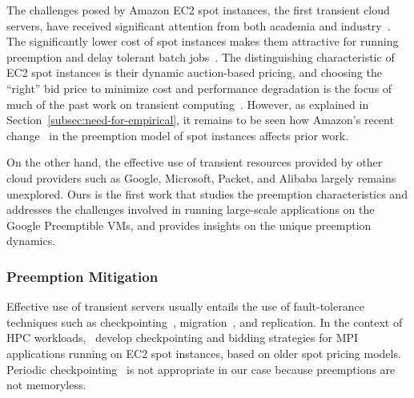 The challenges posed by Amazon EC2 spot instances, the first transient cloud servers, have received significant attention from both academia  and industry~\cite{spotinst}. 
The significantly lower cost of spot instances makes them attractive for running preemption and delay tolerant batch jobs~\cite{spoton, jain14demand, yi2010reducing, conductor, liu-spot, spot-run, dubois2016optispot}.
The distinguishing characteristic of EC2 spot instances is their dynamic auction-based pricing, and choosing the ``right'' bid price to minimize cost and performance degradation is the focus of much of the past work on transient computing~\cite{bidding4,mihailescu2012impact,bidding7,bidding1,bidding8,bidding3,bidding6,bid-cloud,bidding5,wolski_probabilistic_2017, guo_bidding_2015}.
However, as explained in Section~\ref{subsec:need-for-empirical}, it remains to be seen how Amazon's recent change~\cite{bid-change} in the preemption model of spot instances affects prior work. 


On the other hand, the effective use of transient resources provided by other cloud providers such as Google, Microsoft, Packet, and Alibaba largely remains unexplored. 
Ours is the first work that studies the preemption characteristics and addresses the challenges involved in running large-scale applications on the Google Preemptible VMs, and provides insights on the unique preemption dynamics. %

\vspace*{\subsecspace}
\subsubsection{Preemption Mitigation}
Effective use of transient servers usually entails the use of fault-tolerance techniques such as checkpointing~\cite{flint}, migration~\cite{spotcheck}, and replication.
In the context of HPC workloads,~\cite{marathe2014exploiting,gong_monetary_2015,xiang_spotmpi:_2011} develop checkpointing and bidding strategies for MPI applications running on EC2 spot instances, based on older spot pricing models. 
Periodic checkpointing~\cite{dongarra_fault_nodate} is not appropriate in our case because preemptions are not memoryless. 


